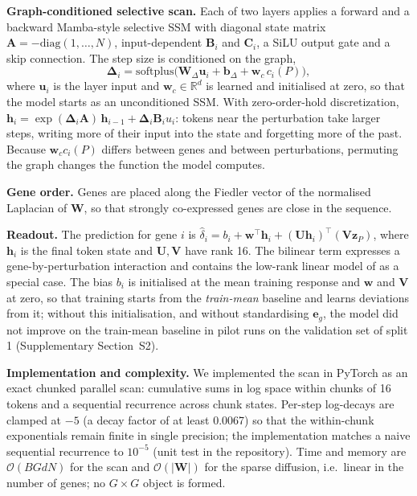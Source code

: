 \documentclass{bioinfo}
\begin{document}
\textbf{Graph-conditioned selective scan.} Each of two layers applies a forward and a backward
Mamba-style selective SSM \citep{gu2023} with diagonal state matrix
$\mathbf{A}=-\mathrm{diag}(1,\dots,N)$, input-dependent $\mathbf{B}_i$ and $\mathbf{C}_i$, a SiLU
output gate and a skip connection. The step size is conditioned on the graph,
\begin{equation}
\bm{\Delta}_i=\mathrm{softplus}\big(\mathbf{W}_{\Delta}\mathbf{u}_i+\mathbf{b}_{\Delta}+\mathbf{w}_c\,c_i(P)\big),
\end{equation}
where $\mathbf{u}_i$ is the layer input and $\mathbf{w}_c\in\mathbb{R}^{d}$ is learned and
initialised at zero, so that the model starts as an unconditioned SSM. With zero-order-hold
discretization, $\mathbf{h}_i=\exp(\bm{\Delta}_i\mathbf{A})\,\mathbf{h}_{i-1}+\bm{\Delta}_i\mathbf{B}_i u_i$:
tokens near the perturbation take larger steps, writing more of their input into the state and
forgetting more of the past. Because $\mathbf{w}_c c_i(P)$ differs between genes and between
perturbations, permuting the graph changes the function the model computes.

\textbf{Gene order.} Genes are placed along the Fiedler vector \citep{fiedler1973} of the normalised
Laplacian of $\mathbf{W}$, so that strongly co-expressed genes are close in the sequence.

\textbf{Readout.} The prediction for gene $i$ is
$\hat\delta_i=b_i+\mathbf{w}^{\top}\mathbf{h}_i+(\mathbf{U}\mathbf{h}_i)^{\top}(\mathbf{V}\mathbf{z}_P)$,
where $\mathbf{h}_i$ is the final token state and $\mathbf{U},\mathbf{V}$ have rank 16. The bilinear
term expresses a gene-by-perturbation interaction and contains the low-rank linear model of
\citet{ahlmann2025} as a special case. The bias $b_i$ is initialised at the mean training response
and $\mathbf{w}$ and $\mathbf{V}$ at zero, so that training starts from the \emph{train-mean}
baseline and learns deviations from it; without this initialisation, and without standardising
$\mathbf{e}_g$, the model did not improve on the train-mean baseline in pilot runs on the
validation set of split 1 (Supplementary Section~S2).

\textbf{Implementation and complexity.} We implemented the scan in PyTorch as an exact chunked
parallel scan: cumulative sums in log space within chunks of 16 tokens and a sequential recurrence
across chunk states. Per-step log-decays are clamped at $-5$ (a decay factor of at least 0.0067) so
that the within-chunk exponentials remain finite in single precision; the implementation matches a
naive sequential recurrence to $10^{-5}$ (unit test in the repository). Time and memory are
$\mathcal{O}(BGdN)$ for the scan and $\mathcal{O}(|\mathbf{W}|)$ for the sparse diffusion, i.e.\
linear in the number of genes; no $G\times G$ object is formed.
\end{document}
